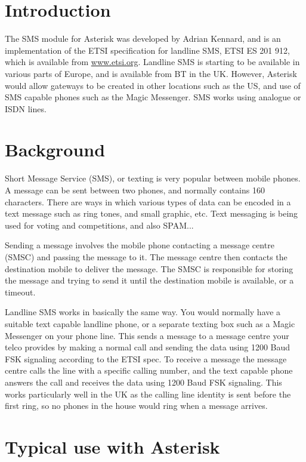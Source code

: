 \section{Introduction}

   The SMS module for Asterisk was developed by Adrian Kennard, and is an
   implementation of the ETSI specification for landline SMS, ETSI ES 201
   912, which is available from \url{www.etsi.org}. Landline SMS is starting to
   be available in various parts of Europe, and is available from BT in
   the UK. However, Asterisk would allow gateways to be created in other
   locations such as the US, and use of SMS capable phones such as the
   Magic Messenger. SMS works using analogue or ISDN lines.

\section{Background}

   Short Message Service (SMS), or texting is very popular between mobile
   phones. A message can be sent between two phones, and normally
   contains 160 characters. There are ways in which various types of data
   can be encoded in a text message such as ring tones, and small
   graphic, etc. Text messaging is being used for voting and
   competitions, and also SPAM...
   
   Sending a message involves the mobile phone contacting a message
   centre (SMSC) and passing the message to it. The message centre then
   contacts the destination mobile to deliver the message. The SMSC is
   responsible for storing the message and trying to send it until the
   destination mobile is available, or a timeout.
   
   Landline SMS works in basically the same way. You would normally have
   a suitable text capable landline phone, or a separate texting box such
   as a Magic Messenger on your phone line. This sends a message to a
   message centre your telco provides by making a normal call and sending
   the data using 1200 Baud FSK signaling according to the ETSI spec. To
   receive a message the message centre calls the line with a specific
   calling number, and the text capable phone answers the call and
   receives the data using 1200 Baud FSK signaling. This works
   particularly well in the UK as the calling line identity is sent
   before the first ring, so no phones in the house would ring when a
   message arrives.

\section{Typical use with Asterisk}

